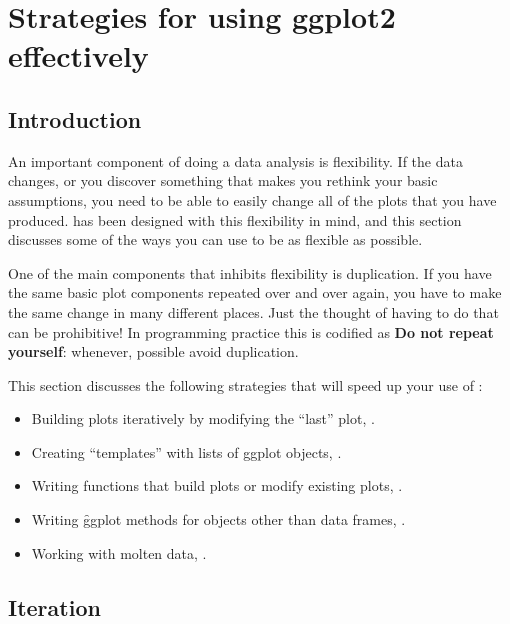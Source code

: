 

\chapter{Strategies for using ggplot2 effectively}
\label{cha:strategy}

\section{Introduction}

An important component of doing a data analysis is flexibility.  If the data changes, or you discover something that makes you rethink your basic assumptions, you need to be able to easily change all of the plots that you have produced.  \ggplot has been designed with this flexibility in mind, and this section discusses some of the ways you can use \ggplot to be as flexible as possible.

One of the main components that inhibits flexibility is duplication. If you have the same basic plot components repeated over and over again, you have to make the same change in many different places.  Just the thought of having to do that can be prohibitive!  In programming practice this is codified as {\bf Do not repeat yourself}: whenever, possible avoid duplication.

This section discusses the following strategies that will speed up your use of \ggplot:

\begin{itemize}
  \item Building plots iteratively by modifying the ``last'' plot, .

  \item Creating ``templates'' with lists of ggplot objects, .

  \item Writing functions that build plots or modify existing plots, .

  \item Writing \f{ggplot} methods for objects other than data frames, .

  \item Working with molten data, .

\end{itemize}

\section{Iteration}
\label{sec:iteration}

